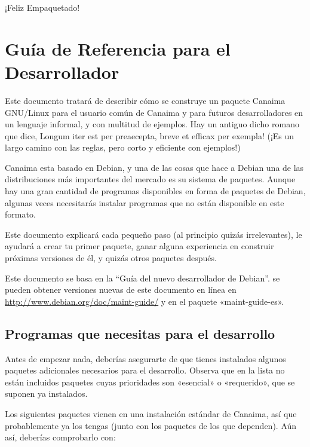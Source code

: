 \documentclass[letterpaper,12pt,spanish]{manual}
\begin{document}
¡Feliz Empaquetado!

\resetcurrentobjects
\hypertarget{--doc-guia-referencia}{}

\chapter{\textbf{Guía de Referencia para el Desarrollador}}

Este documento tratará de describir cómo se construye un paquete Canaima GNU/Linux para el usuario común de Canaima y para futuros desarrolladores en un lenguaje informal, y con multitud de ejemplos. Hay un antiguo dicho romano que dice, Longum iter est per preaecepta, breve et efficax per exempla! (¡Es un largo camino con las reglas, pero corto y eficiente con ejemplos!)

Canaima esta basado en Debian, y una de las cosas que hace a Debian una de las distribuciones más importantes del mercado es su sistema de paquetes. Aunque hay una gran cantidad de programas disponibles en forma de paquetes de Debian, algunas veces necesitarás instalar programas que no están disponible en este formato.

Este documento explicará cada pequeño paso (al principio quizás irrelevantes), le ayudará a crear tu primer paquete, ganar alguna experiencia en construir próximas versiones de él, y quizás otros paquetes después.

Este documento se basa en la ``Guía del nuevo desarrollador de Debian''. se pueden obtener versiones nuevas de este documento en línea en \href{http://www.debian.org/doc/maint-guide/}{http://www.debian.org/doc/maint-guide/} y en el paquete «maint-guide-es».


\section{\textbf{Programas que necesitas para el desarrollo}}

Antes de empezar nada, deberías asegurarte de que tienes instalados algunos paquetes adicionales necesarios para el desarrollo. Observa que en la lista no están incluidos paquetes cuyas prioridades son «esencial» o «requerido», que se suponen ya instalados.

Los siguientes paquetes vienen en una instalación estándar de Canaima, así que probablemente ya los tengas (junto con los paquetes de los que dependen). Aún así, deberías comprobarlo con:
\end{document}
